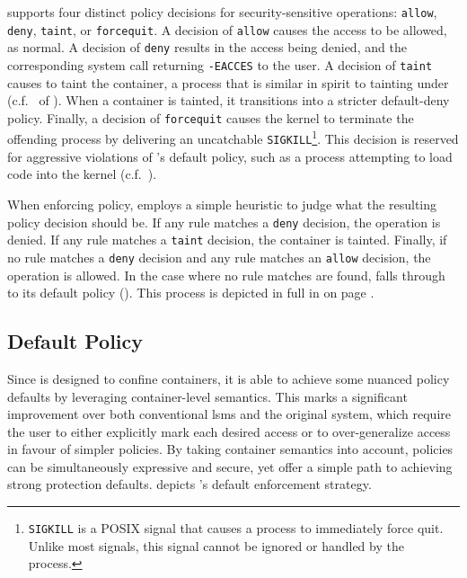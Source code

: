 \bpfcontain{} supports four distinct policy decisions for security-sensitive operations:
\texttt{allow}, \texttt{deny}, \texttt{taint}, or \texttt{forcequit}. A decision of
\texttt{allow} causes the access to be allowed, as normal. A decision of \texttt{deny}
results in the access being denied, and the corresponding system call returning
\texttt{-EACCES} to the user. A decision of \texttt{taint} causes \bpfcontain{} to taint
the container, a process that is similar in spirit to tainting under \bpfbox{}
(c.f.~ of ). When a container is tainted, it
transitions into a stricter default-deny policy. Finally, a decision of \texttt{forcequit}
causes the kernel to terminate the offending process by delivering an uncatchable
\texttt{SIGKILL}\footnote{\texttt{SIGKILL} is a POSIX signal that causes a process to
immediately force quit. Unlike most signals, this signal cannot be ignored or handled by
the process.}. This decision is reserved for aggressive violations of \bpfcontain{}'s
default policy, such as a process attempting to load code into the kernel
(c.f.~).

When enforcing policy, \bpfcontain{} employs a simple heuristic to judge what the
resulting policy decision should be. If any rule matches a \texttt{deny} decision, the
operation is denied. If any rule matches a \texttt{taint} decision, the container is
tainted.  Finally, if no rule matches a \texttt{deny} decision and any rule matches an
\texttt{allow} decision, the operation is allowed. In the case where no rule matches are
found, \bpfcontain{} falls through to its default policy ().
This process is depicted in full in  on page
\pageref{fig:bpfcontain-enforcement}.

\subsection{Default Policy}%
\label{ss:bpfcontain-default}

Since \bpfcontain{} is designed to confine containers, it is able to achieve some nuanced
policy defaults by leveraging container-level semantics. This marks a significant
improvement over both conventional \glspl{lsm} and the original \bpfbox{} system, which
require the user to either explicitly mark each desired access or to over-generalize
access in favour of simpler policies. By taking container semantics into account,
\bpfcontain{} policies can be simultaneously expressive and secure, yet offer a simple
path to achieving strong protection defaults.  depicts
\bpfcontain{}'s default enforcement strategy.

